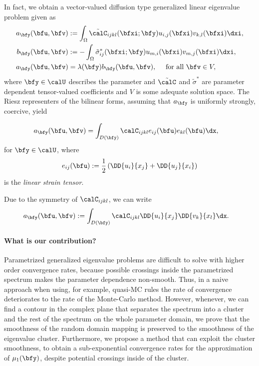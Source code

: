 


In fact, we obtain a vector-valued diffusion type generalized linear eigenvalue problem given as
\begin{align*}
    a_\bfy(\bfu, \bfv) &:=  \int_{\Omega} \tilde{\calC}_{ijkl}(\bfxi;\bfy)u_{i,j}(\bfxi)v_{k,l}(\bfxi) \dxi,  \\
    \label{eq:bilinearforms2}
    b_\bfy(\bfu, \bfv)  &:= -\int_{\Omega}  \tilde{\sigma}^*_{ij}(\bfxi;\bfy) u_{m,i}(\bfxi)v_{m,j}(\bfxi) \dxi, \\
     a_\bfy(\bfu, \bfv) &= \lambda(\bfy)  b_\bfy(\bfu, \bfv), \quad \text{ for all } \bfv \in V,
\end{align*}
where $\bfy \in \calU$ describes the parameter and $\tilde \calC$ and $\tilde \sigma^*$ are 
parameter dependent tensor-valued coefficients and $V$ is some adequate solution space. 
The Riesz representers of the bilinear forms, assuming that $a_\bfy$ is uniformly strongly, coercive, yield


 \begin{align*}
    a_\bfy(\bfu,\bfv) &=   \int_{D(\bfy)} \calC_{ijkl} e_{ij}( \bfu)  e_{kl}( \bfu) \dx,
\end{align*} 
for $\bfy \in \calU$, where 
\begin{align}\label{eq:linearstrainInU}
    e_{ij}(\bfu) :=\frac 1 2\left(\DD{ u_i}{ x_j}  +\DD{ u_j}{ x_i}\right) 
\end{align} is the \emph{linear strain tensor}.


Due to the symmetry of $\calC_{ijkl}$, we 
can write 
\begin{align*}
    a_\bfy(\bfu,\bfv) &:=   \int_{D(\bfy)} \calC_{ijkl} \DD{ u_i}{ x_j} \DD{v_k}{x_l} \dx.
\end{align*} 
\paragraph{What is our contribution?} Parametrized generalized eigenvalue problems are difficult to solve with higher order convergence rates, because possible crossings inside the parametrized spectrum makes the parameter dependence non-smooth.
Thus, in a naive approach when using, for example, quasi-MC rules the rate of convergence deteriorates to the rate of the Monte-Carlo method.
However, whenever, we can find a contour in the complex plane that separates the spectrum into a cluster and the rest of the spectrum on the whole parameter domain, we prove that the smoothness of the random domain mapping is preserved to the smoothness of the eigenvalue cluster. 
Furthermore, we propose a method that can exploit the cluster smoothness, to obtain a sub-exponential convergence rates for the approximation of $\mu_1(\bfy)$, despite potential crossings inside of the cluster.

